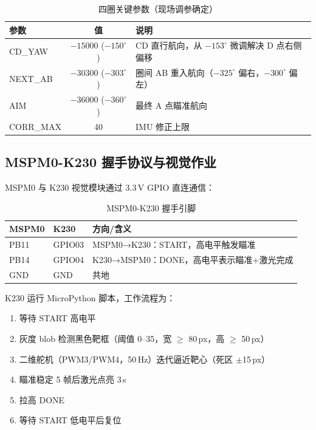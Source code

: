 \documentclass[12pt,a4paper]{ctexart}
\begin{document}
\begin{table}[H]
\centering
\caption{四圈关键参数（现场调参确定）}
\begin{tabular}{@{}lcl@{}}
\toprule
\textbf{参数} & \textbf{值} & \textbf{说明} \\
\midrule
CD\_YAW   & $-15000$ ($-150^\circ$) & CD 直行航向，从 $-153^\circ$ 微调解决 D 点右侧偏移 \\
NEXT\_AB  & $-30300$ ($-303^\circ$) & 圈间 AB 重入航向（$-325^\circ$ 偏右，$-300^\circ$ 偏左）\\
AIM       & $-36000$ ($-360^\circ$) & 最终 A 点瞄准航向 \\
CORR\_MAX & 40                    & IMU 修正上限 \\
\bottomrule
\end{tabular}
\end{table}

\subsection{MSPM0-K230 握手协议与视觉作业}

MSPM0 与 K230 视觉模块通过 3.3\,V GPIO 直连通信：

\begin{table}[H]
\centering
\caption{MSPM0-K230 握手引脚}
\begin{tabular}{@{}lll@{}}
\toprule
\textbf{MSPM0} & \textbf{K230} & \textbf{方向/含义} \\
\midrule
PB11 & GPIO03 & MSPM0→K230：START，高电平触发瞄准 \\
PB14 & GPIO04 & K230→MSPM0：DONE，高电平表示瞄准+激光完成 \\
GND  & GND    & 共地 \\
\bottomrule
\end{tabular}
\end{table}

K230 运行 MicroPython 脚本，工作流程为：
\begin{enumerate}[nosep]
    \item 等待 START 高电平
    \item 灰度 blob 检测黑色靶框（阈值 0--35，宽 $\geq$ 80\,px，高 $\geq$ 50\,px）
    \item 二维舵机（PWM3/PWM4，50\,Hz）迭代逼近靶心（死区 $\pm$15\,px）
    \item 瞄准稳定 5 帧后激光点亮 3\,s
    \item 拉高 DONE
    \item 等待 START 低电平后复位
\end{enumerate}
\end{document}
